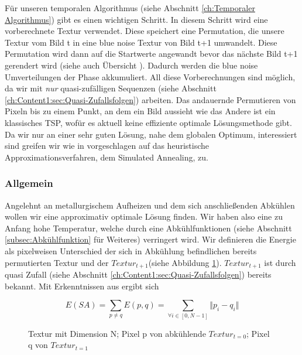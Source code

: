 Für unseren temporalen Algorithmus (siehe Abschnitt \ref{ch:Temporaler Algorithmus}) gibt es einen 
wichtigen  Schritt.
In diesem Schritt wird eine vorberechnete Textur verwendet. Diese speichert eine
Permutation, die unsere  Textur vom Bild t in eine
blue noise Textur von Bild t+1 umwandelt. Diese Permutation wird 
dann auf die Startwerte angewandt bevor das nächste Bild t+1 gerendert wird (siehe auch Übersicht ).
Dadurch werden die blue noise Umverteilungen der  Phase akkumuliert. 
All diese Vorberechnungen sind möglich, da wir mit \textit{\glqq nur\grqq} quasi-zufälligen Sequenzen 
(siehe Abschnitt \ref{ch:Content1:sec:Quasi-Zufallsfolgen}) arbeiten.
Das andauernde Permutieren von Pixeln bis zu einem Punkt, an dem ein Bild aussieht wie das Andere ist 
ein klassisches TSP, wofür es aktuell keine effiziente optimale Lösungsmethode gibt.
Da wir nur an einer sehr guten Lösung, nahe dem globalen Optimum, interessiert sind 
greifen wir wie in \cite{hal02158423} vorgeschlagen auf das heuristische Approximationsverfahren,
dem Simulated Annealing, zu.

\subsubsection{Allgemein}

Angelehnt an metallurgischem Aufheizen und dem sich anschließenden Abkühlen wollen wir eine approximativ
optimale Lösung finden. Wir haben also eine zu Anfang hohe Temperatur, welche durch eine Abkühlfunktionen
(siehe Abschnitt \ref{subsec:Abkühlfunktion} für Weiteres) verringert wird.
Wir definieren die Energie als pixelweisen Unterschied der sich in Abkühlung 
befindlichen bereits permutierten Textur und der $Textur_{t+1}$(siehe Abbildung \ref{eq:pixel energy function}). 
$Textur_{t+1}$ ist durch quasi Zufall (siehe Abschnitt \ref{ch:Content1:sec:Quasi-Zufallsfolgen}) bereits bekannt.
Mit Erkenntnissen aus\cite{georgiev2016blue} ergibt sich

\begin{figure}[H]
    \begin{tcolorbox}[rightrule=3mm, rounded corners=east]
    \[ E(SA) = \sum_{p \neq q}E(p,q) = \sum_{\forall i \in [0,N-1]} \Vert{p_{i}-q_{i}}\Vert \]
    \end{tcolorbox}
    \caption{ Textur mit Dimension N; Pixel p von abkühlende 
    $Textur_{t=0}$; Pixel q von $Textur_{t=1}$}
    \label{eq:pixel energy function}
\end{figure}

